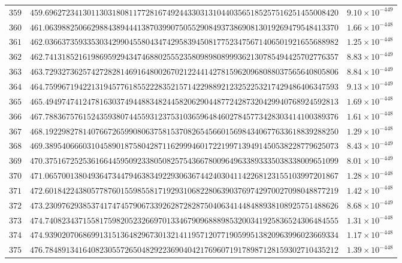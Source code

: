 \documentclass[12pt,reqno]{amsart}
\theoremstyle{remark}
\begin{document}
\begin{longtable}{clc}
$359$ & $459.6962723413011303180811772816749244330313104403565185257516251455008420$ & $9.10\times 10^{-449}$ \\
$360$ & $461.0639882506629884389444138703990750552908493738690813019269479548413370$ & $1.66\times 10^{-448}$ \\
$361$ & $462.0366373593353034299045580434742958394508177523475671406501921655688982$ & $1.25\times 10^{-448}$ \\
$362$ & $462.7413185216198695929434746880255523580989808999362130785494425702776357$ & $8.83\times 10^{-449}$ \\
$363$ & $463.7293273625742728281469164800267021224414278159620968088037565640805806$ & $8.84\times 10^{-449}$ \\
$364$ & $464.7599671942213194577618552228352157142298892123252253217429486406347593$ & $9.13\times 10^{-449}$ \\
$365$ & $465.4949747412478163037494488348244582062904487724287320429940768924592813$ & $1.69\times 10^{-448}$ \\
$366$ & $467.7883675761524359380744559312375310365964846027845773428303414100389376$ & $1.61\times 10^{-448}$ \\
$367$ & $468.1922982781407667265990806375815370826545660156984340677633618839288250$ & $1.29\times 10^{-448}$ \\
$368$ & $469.3895406660310458901875804287116299946017221997139491450538228779625073$ & $8.43\times 10^{-449}$ \\
$369$ & $470.3751672525361664459509233805082575436678009649633893335038338009651099$ & $8.01\times 10^{-449}$ \\
$370$ & $471.0657001380493647344794638349229306367442403041142268123155103997201867$ & $1.28\times 10^{-448}$ \\
$371$ & $472.6018422438057787601559855817192931068228063903769742970027098048877219$ & $1.42\times 10^{-448}$ \\
$372$ & $473.2309762938537417474579067339262872828750406341448488938108925751488626$ & $8.68\times 10^{-449}$ \\
$373$ & $474.7408234371558175982052326697013346790968889853200341925836524306484555$ & $1.31\times 10^{-448}$ \\
$374$ & $474.9390207068699131513648296730132141195712077190599513820963996023669334$ & $1.17\times 10^{-448}$ \\
$375$ & $476.7848913416408230557265048292236904042176960719178987128159302710435212$ & $1.39\times 10^{-448}$ \\

\end{longtable}
\end{document}
